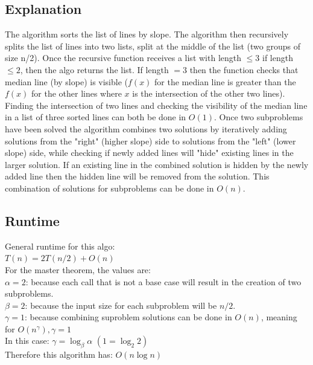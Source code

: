 \documentclass[11pt]{article}
\begin{document}
\subsection*{Explanation}
The algorithm sorts the list of lines by slope. The algorithm then recursively splits the list of lines into two lists, split at the middle of the list (two groups of size n/2). Once the recursive function receives a list with length $\leq{3}$ if length $\leq{2}$, then the algo returns the list. If length $=3$ then the function checks that median line (by slope) is visible ($f(x)$ for the median line is greater than the $f(x)$ for the other lines where $x$ is the intersection of the other two lines). Finding the intersection of two lines and checking the visibility of the median line in a list of three sorted lines can both be done in $O(1)$. Once two subproblems have been solved the algorithm combines two solutions by iteratively adding solutions from the "right" (higher slope) side to solutions from the "left" (lower slope) side, while checking if newly added lines will "hide" existing lines in the larger solution. If an existing line in the combined solution is hidden by the newly added line then the hidden line will be removed from the solution. This combination of solutions for subproblems can be done in $O(n)$.

\subsection*{Runtime}
General runtime for this algo:\\
$T(n) = 2T(n/2) + O(n)$\\

\noindent For the master theorem, the values are:\\
\noindent $\alpha=2$: because each call that is not a base case will result in the creation of two subproblems.\\
$\beta=2$: because the input size for each subproblem will be $n/2$.\\
$\gamma=1$: because combining suproblem solutions can be done in $O(n)$, meaning for $O(n^\gamma), \gamma=1$\\

\noindent In this case: $\gamma = \log_\beta \alpha$ $(1 = \log_2 2)$\\
Therefore this algorithm has: $O(n \log n)$
\end{document}
